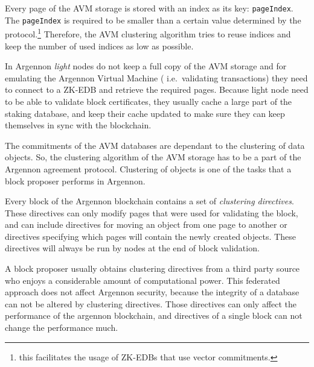 Every page of the AVM storage is stored with an index as its key: \texttt{pageIndex}. The \texttt{pageIndex} is
required to be smaller than a certain value determined by the
protocol.\footnote{this facilitates the usage of ZK-EDBs that use vector commitments.}
Therefore, the AVM clustering algorithm tries to reuse indices and keep the number of used indices as low as
possible.

In Argennon \emph{light} nodes do not keep a full copy of the AVM storage and for emulating the Argennon Virtual Machine
( i.e.~validating transactions) they need to connect to a ZK-EDB and retrieve the required pages.
Because light node need to be able to validate block certificates, they usually cache a large part of the staking
database, and keep their cache updated to make sure they can keep themselves in sync with the blockchain.

The commitments of the AVM databases are dependant to the clustering of data objects. So, the clustering algorithm of
the AVM storage has to be a part of the Argennon agreement protocol. Clustering of objects is one of the
tasks that a block proposer performs in Argennon.

Every block of the Argennon blockchain contains a set of \emph{clustering directives}. These directives
can only modify pages that were used for validating the block, and can
include directives for moving an object from one page to another or directives specifying which pages will contain
the newly created objects. These directives will always be run by nodes at the end of block validation.

A block proposer usually obtains clustering directives from a third party source who enjoys a considerable amount of
computational power. This federated approach does not affect Argennon security, because the integrity of a
database can not be altered by clustering directives. Those
directives can only affect the performance of the argennon blockchain, and directives of a single block can
not change the performance much.
